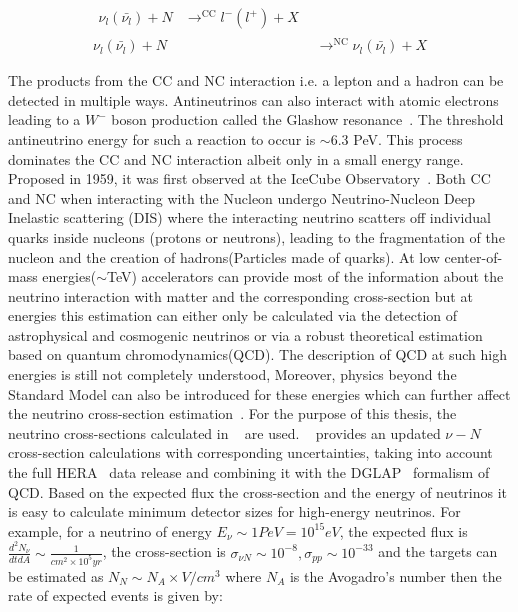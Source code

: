 \begin{subequations}\label{eq:NuCC_NC}
  \begin{align}
    \begin{split}
      \nu_l(\bar{\nu_l}) + N &\mathop{\longrightarrow}^{\mathrm{CC}} l^-(l^+) + X 
    \end{split} \\
    \nu_l(\bar{\nu_l}) + N &\mathop{\longrightarrow}^{\mathrm{NC}} \nu_l(\bar{\nu_l}) + X
  \end{align}
\end{subequations}

The products from the CC and NC interaction i.e. a lepton and a hadron can be detected in multiple ways. 
Antineutrinos can also interact with atomic electrons leading to a $W^-$ boson production called the Glashow resonance~\cite{PhysRev.118.316}. The threshold antineutrino energy for such a reaction to occur is $\sim$6.3 PeV. This process dominates the CC and NC interaction albeit only in a small energy range. Proposed in 1959, it was first observed at the IceCube Observatory~\cite{IceCube:2021rpz}. Both CC and NC when interacting with the Nucleon undergo Neutrino-Nucleon Deep Inelastic scattering (DIS) where the interacting neutrino scatters off individual quarks inside nucleons (protons or neutrons), leading to the fragmentation of the nucleon and the creation of hadrons(Particles made of quarks). At low center-of-mass energies($\sim$TeV) accelerators can provide most of the information about the neutrino interaction with matter and the corresponding cross-section but at energies this estimation can either only be calculated via the detection of astrophysical and cosmogenic neutrinos or via a robust theoretical estimation based on quantum chromodynamics(QCD). The description of QCD at such high energies is still not completely understood, Moreover, physics beyond the Standard Model can also be introduced for these energies which can further affect the neutrino cross-section estimation~\cite{PhysRevD.107.033009}. For the purpose of this thesis, the neutrino cross-sections calculated in ~\cite{Cooper_Sarkar_2011} are used. ~\cite{Cooper_Sarkar_2011} provides an updated $\nu -N$ cross-section calculations with corresponding uncertainties, taking into account the full HERA~\cite{aaron2010combined} data release and combining it with the DGLAP~\cite{ALTARELLI1977298,Dokshitzer:1977sg,Gribov:427157} formalism of QCD. Based on the expected flux the cross-section and the energy of neutrinos it is easy to calculate minimum detector sizes for high-energy neutrinos. For example, for a neutrino of energy $E_{\nu} \sim 1PeV = 10^{15} eV $, the expected flux is $\frac{d^2N_{\nu}}{dt dA} \sim \frac{1}{cm^2 \times 10^5 yr}$, the cross-section is $\sigma_{\nu N} \sim 10^{-8} , \sigma_{pp} \sim 10^{-33}$ and the targets can be estimated as $ N_N \sim N_A \times V/cm^3$ where $N_A$ is the Avogadro's number then the rate of expected events is given by:

